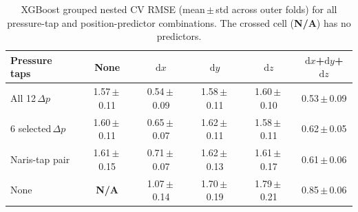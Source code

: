         \begin{table}[htbp]
        \centering
        \captionsetup{font=footnotesize}
        \caption{XGBoost grouped nested CV RMSE (mean\,$\pm$\,std across outer folds) for all pressure-tap and position-predictor combinations. The crossed cell (\textbf{N/A}) has no predictors.}
        \footnotesize
        \setlength{\tabcolsep}{5pt}
        \renewcommand{\arraystretch}{1.2}
        \begin{tabular}{l|ccccc}
        \hline\hline
        \textbf{Pressure taps} & \textbf{None} & \textbf{$\mathrm{d}x$} & \textbf{$\mathrm{d}y$} & \textbf{$\mathrm{d}z$} & \textbf{$\mathrm{d}x$+$\mathrm{d}y$+$\mathrm{d}z$} \\
        \hline
        All 12\,$\Delta p$ & 1.57\,$\pm$\,0.11 & 0.54\,$\pm$\,0.09 & 1.58\,$\pm$\,0.11 & 1.60\,$\pm$\,0.10 & 0.53\,$\pm$\,0.09 \\
        6 selected\,$\Delta p$ & 1.60\,$\pm$\,0.11 & 0.65\,$\pm$\,0.07 & 1.62\,$\pm$\,0.11 & 1.58\,$\pm$\,0.11 & 0.62\,$\pm$\,0.05 \\
        Naris-tap pair & 1.61\,$\pm$\,0.15 & 0.71\,$\pm$\,0.07 & 1.62\,$\pm$\,0.13 & 1.61\,$\pm$\,0.17 & 0.61\,$\pm$\,0.06 \\
        None & \textbf{N/A} & 1.07\,$\pm$\,0.14 & 1.70\,$\pm$\,0.19 & 1.79\,$\pm$\,0.21 & 0.85\,$\pm$\,0.06 \\
        \hline
        \end{tabular}
        \label{tab:heatmap_rmse}
        \end{table}
